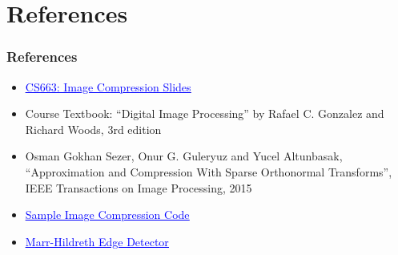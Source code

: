 \documentclass[Serif, 10pt, brown]{beamer}
\theoremstyle{example}
\theoremstyle{plain}
\begin{document}
\section{References}

\begin{frame}
	\frametitle{References}
	\begin{itemize}
		\item \href{https://docs.google.com/presentation/d/1-8xCg7o8Vtc9ghJf6y1Nkq9-TV0qSNfX/edit?usp=sharing&ouid=115909013767952805958&rtpof=true&sd=true}{\textcolor{blue}{\underline{CS663: Image Compression Slides}}}
		\item Course Textbook: ``Digital Image Processing'' by Rafael C. Gonzalez and Richard Woods, 3rd edition
		\item Osman Gokhan Sezer, Onur G. Guleryuz and Yucel Altunbasak, ``Approximation and Compression With Sparse Orthonormal Transforms'', IEEE Transactions on Image Processing, 2015
		\item \href{https://github.com/jeremyfell/image-compression/blob/master/image-compression.py}{\textcolor{blue}{\underline{Sample Image Compression Code}}}
		\item \href{https://github.com/adl1995/edge-detectors/blob/master/marr-hildreth-edge.py}{\textcolor{blue}{\underline{Marr-Hildreth Edge Detector}}}
	\end{itemize}
\end{frame}
\end{document}
